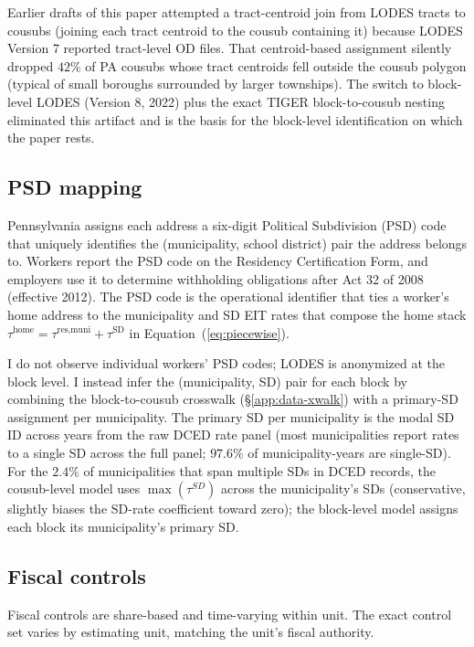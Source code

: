 \documentclass[12pt]{article}
\begin{document}
Earlier drafts of this paper attempted a tract-centroid join from
LODES tracts to cousubs (joining each tract centroid to the cousub
containing it) because LODES Version 7 reported tract-level OD
files. That centroid-based assignment silently dropped $42\%$ of PA
cousubs whose tract centroids fell outside the cousub polygon
(typical of small boroughs surrounded by larger townships). The
switch to block-level LODES (Version 8, 2022) plus the exact
TIGER block-to-cousub nesting eliminated this artifact and is the
basis for the block-level identification on which the paper rests.

\subsection{PSD mapping}
\label{app:data-psd}

Pennsylvania assigns each address a six-digit Political Subdivision
(PSD) code that uniquely identifies the (municipality, school district)
pair the address belongs to. Workers report the PSD code on the
Residency Certification Form, and employers use it to determine
withholding obligations after Act 32 of 2008 (effective 2012). The
PSD code is the operational identifier that ties a worker's home
address to the municipality and SD EIT rates that compose the
home stack $\tau^{\text{home}} = \tau^{\text{res,muni}} +
\tau^{\text{SD}}$ in Equation~(\ref{eq:piecewise}).

I do not observe individual workers' PSD codes; LODES is anonymized
at the block level. I instead infer the (municipality, SD) pair for each
block by combining the block-to-cousub crosswalk
(\S\ref{app:data-xwalk}) with a primary-SD assignment per municipality. The
primary SD per municipality is the modal SD ID across years from
the raw DCED rate panel (most municipalities report rates to a single SD
across the full panel; $97.6\%$ of municipality-years are single-SD). For
the $2.4\%$ of municipalities that span multiple SDs in DCED records, the
cousub-level model uses $\max(\tau^{SD})$ across the municipality's SDs
(conservative, slightly biases the SD-rate coefficient toward zero);
the block-level model assigns each block its municipality's primary SD.

\subsection{Fiscal controls}
\label{app:data-fiscal}

Fiscal controls are share-based and time-varying within unit. The
exact control set varies by estimating unit, matching the unit's
fiscal authority.
\end{document}
